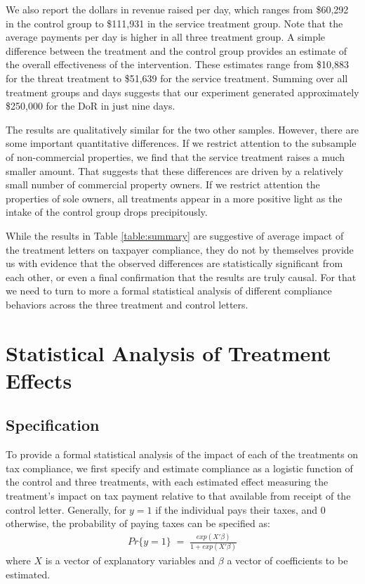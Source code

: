 \documentclass[12pt,titlepage]{article}
\begin{document}
We also report the dollars in revenue raised per day, which ranges
from \$60,292 in the control group to \$111,931 in the service
treatment group. Note that the average payments per day is higher in
all three treatment group. A simple difference between the treatment
and the control group provides an estimate of the overall
effectiveness of the intervention. These estimates range from \$10,883
for the threat treatment to \$51,639 for the service treatment. Summing
over all treatment groups and days suggests that our experiment
generated approximately \$250,000 for the DoR in just nine days.

The results are qualitatively similar for the two other
samples. However, there are some important quantitative
differences. If we restrict attention to the subsample of
non-commercial properties, we find that the service treatment raises a
much smaller amount. That suggests that these differences are driven
by a relatively small number of commercial property owners.  If we
restrict attention the properties of sole owners, all treatments
appear in a more positive light as the intake of the control group
drops precipitously.

While the results in Table \ref{table:summary} are suggestive of
average impact of the treatment letters on taxpayer compliance, they
do not by themselves provide us with evidence that the observed
differences are statistically significant from each other, or even a
final confirmation that the results are truly causal.  For that we
need to turn to more a formal statistical analysis of different
compliance behaviors across the three treatment and control letters.

\section{Statistical Analysis of Treatment Effects}

\subsection{Specification}

To provide a formal statistical analysis of the impact of each of the
treatments on tax compliance, we first specify and estimate compliance
as a logistic function of the control and three treatments, with each
estimated effect measuring the treatment's impact on tax payment
relative to that available from receipt of the control letter.
Generally, for $y = 1$ if the individual pays their taxes, and 0
otherwise, the probability of paying taxes can be specified as:
\begin{eqnarray*}
Pr \{ y=1 \} \; = \; \frac{exp(X' \beta)}{1 + exp(X' \beta)}
\end{eqnarray*}
where $X$ is a vector of explanatory variables and $\beta$ a vector of coefficients to be estimated. 
\end{document}
